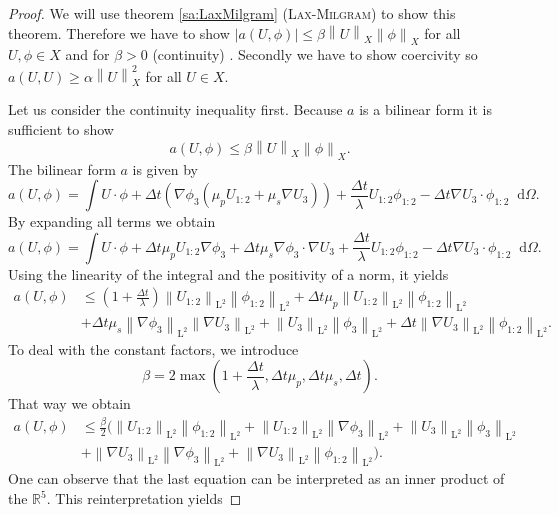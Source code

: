 \documentclass[12pt,a4paper,twoside, open=right]{scrreprt}
\theoremstyle{definition}
\theoremstyle{plain}
\newcommand{\abs}[1]{\left\vert #1\right\vert}
\newcommand{\rr}{\mathbb{R}}
\newcommand{\norm}[1]{\left\lVert#1\right\rVert}
\newcommand{\ltnorm}[1]{\norm{#1}_{\mathrm{L}^2}}
\newcommand{\D}{\mathop{}\!\mathrm{d}}
\begin{document}
\begin{proof}
    We will use theorem \ref{sa:LaxMilgram} (\textsc{Lax-Milgram}) to show this theorem. Therefore we have to show $\abs{a(U,\phi)}\le \beta\norm{U}_X\norm{\phi}_X$ for all $U,\phi\in X$ and for $\beta >0$ (continuity) . Secondly we have to show coercivity so $a(U,U)\ge \alpha\norm{U}^2_X$ for all $U\in X$. \par 
    Let us consider the continuity inequality first. Because $a$ is a bilinear form it is sufficient to show 
    \begin{equation}
        a(U,\phi)\le\beta\norm{U}_X\norm{\phi}_X.
    \end{equation}
    The bilinear form $a$ is given by
    \begin{equation}
        a(U,\phi)=\int U\cdot\phi +\Delta t(\nabla\phi_3(\mu_pU_{1:2}+\mu_s\nabla U_3))+\frac{\Delta t}{\lambda}U_{1:2}\phi_{1:2}-\Delta t\nabla U_3\cdot \phi_{1:2}\D\Omega.
    \end{equation}
    By expanding all terms we obtain
    \begin{equation}
        a(U,\phi)=\int U\cdot\phi +\Delta t\mu_pU_{1:2}\nabla\phi_3+\Delta t\mu_s\nabla \phi_3\cdot\nabla U_3+\frac{\Delta t}{\lambda}U_{1:2}\phi_{1:2}-\Delta t\nabla U_3\cdot\phi_{1:2}\D\Omega.
    \end{equation}
    Using the linearity of the integral and the positivity of a norm, it yields
    \begin{align}
        a(U,\phi)&\le \left(1+\frac{\Delta t}{\lambda}\right)\ltnorm{U_{1:2}}\ltnorm{\phi_{1:2}}+\Delta t\mu_p\ltnorm{U_{1:2}}\ltnorm{\phi_{1:2}}\\&+\Delta t\mu_s\ltnorm{\nabla\phi_3}\ltnorm{\nabla U_3}+\ltnorm{U_3}\ltnorm{\phi_3}+\Delta t\ltnorm{\nabla U_3}\ltnorm{\phi_{1:2}}.
    \end{align}
    To deal with the constant factors, we introduce 
    \begin{equation}
        \beta=2\max\left(1+\frac{\Delta t}{\lambda}, \Delta t\mu_p,\Delta t\mu_s,\Delta t\right).
    \end{equation}
    That way we obtain
    \begin{align}
        a(U,\phi)&\le \frac{\beta}{2}\big(\ltnorm{U_{1:2}}\ltnorm{\phi_{1:2}}+\ltnorm{U_{1:2}}\ltnorm{\nabla\phi_3}+\ltnorm{U_3}\ltnorm{\phi_3}\\&+\ltnorm{\nabla U_3}\ltnorm{\nabla\phi_3}+\ltnorm{\nabla U_3}\ltnorm{\phi_{1:2}}\big).
    \end{align}
    One can observe that the last equation can be interpreted as an inner product of the $\rr^5$. This reinterpretation yields

\end{proof}
\end{document}

